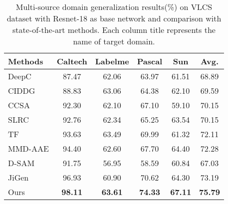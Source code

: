 \documentclass[10pt,twocolumn,letterpaper]{article}
\begin{document}
\begin{table}[t!]
	\begin{center}
		\tabcolsep=0.15cm
		\begin{tabular}{l|c c c c|c}
			\hline
			\hline
			Methods&Caltech&Labelme&Pascal&Sun&Avg.\\
			\hline
			DeepC\cite{li2018deep}&87.47&62.06&63.97&61.51&68.89\\
			CIDDG\cite{li2018deep}&88.83&63.06&64.38&62.10&69.59\\
			CCSA\cite{motiian2017unified}&92.30&62.10&67.10&59.10&70.15\\
			SLRC\cite{ding2017deep}&92.76&62.34&65.25&63.54&70.15\\
			TF\cite{li2017deeper}&93.63&63.49&69.99&61.32&72.11\\
			MMD-AAE\cite{li2018domain}&94.40&62.60&67.70&64.40&72.28\\
			D-SAM\cite{d2018domain}&91.75&56.95&58.59&60.84&67.03\\
			JiGen\cite{carlucci2019domain}&96.93&60.90&70.62&64.30&73.19\\
			Ours&\textbf{98.11}&\textbf{63.61}&\textbf{74.33}&\textbf{67.11}&\textbf{75.79}\\
			\hline\hline
		\end{tabular}
	\end{center}
	\caption{Multi-source domain generalization results(\%) on VLCS dataset\cite{torralba2011unbiased} with Resnet-18 as base network and comparison with state-of-the-art methods. Each column title represents the name of target domain.}
	\label{table3}
\end{table}
\end{document}
